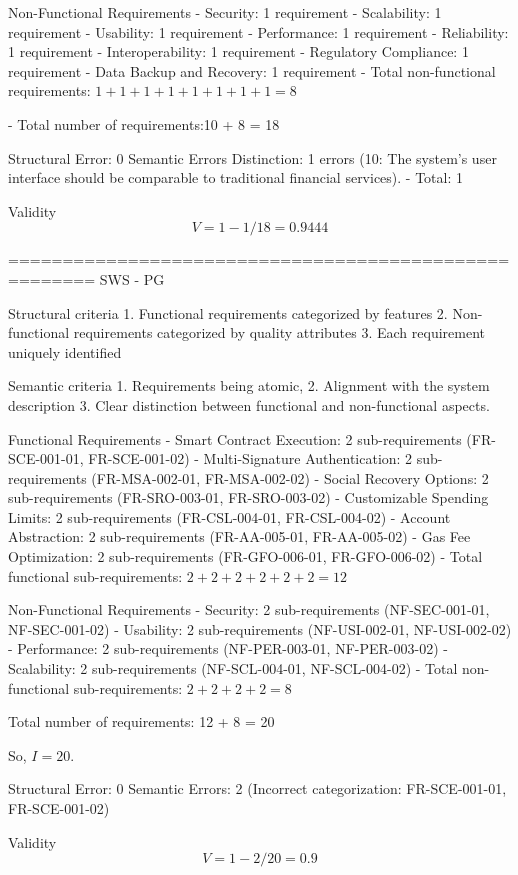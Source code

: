 Non-Functional Requirements
- Security: 1 requirement
- Scalability: 1 requirement
- Usability: 1 requirement
- Performance: 1 requirement
- Reliability: 1 requirement
- Interoperability: 1 requirement
- Regulatory Compliance: 1 requirement
- Data Backup and Recovery: 1 requirement
- Total non-functional requirements: \( 1 + 1 + 1 + 1 + 1 + 1 + 1 + 1 = 8 \)

- Total number of requirements:10 + 8 = 18

Structural Error: 0
Semantic Errors 
\- Distinction: 1 errors (10: The system's user interface should be comparable to traditional financial services).
- Total: 1

Validity
\[
V = 1 - 1/18 = 0.9444
\]

======================================================
SWS - PG

Structural criteria 
1. Functional requirements categorized by features
2. Non-functional requirements categorized by quality attributes
3. Each requirement uniquely identified

Semantic criteria
1. Requirements being atomic, 
2. Alignment with the system description
3. Clear distinction between functional and non-functional aspects. 

Functional Requirements
- Smart Contract Execution: 2 sub-requirements (FR-SCE-001-01, FR-SCE-001-02)
- Multi-Signature Authentication: 2 sub-requirements (FR-MSA-002-01, FR-MSA-002-02)
- Social Recovery Options: 2 sub-requirements (FR-SRO-003-01, FR-SRO-003-02)
- Customizable Spending Limits: 2 sub-requirements (FR-CSL-004-01, FR-CSL-004-02)
- Account Abstraction: 2 sub-requirements (FR-AA-005-01, FR-AA-005-02)
- Gas Fee Optimization: 2 sub-requirements (FR-GFO-006-01, FR-GFO-006-02)
- Total functional sub-requirements: \( 2 + 2 + 2 + 2 + 2 + 2 = 12 \)

Non-Functional Requirements
- Security: 2 sub-requirements (NF-SEC-001-01, NF-SEC-001-02)
- Usability: 2 sub-requirements (NF-USI-002-01, NF-USI-002-02)
- Performance: 2 sub-requirements (NF-PER-003-01, NF-PER-003-02)
- Scalability: 2 sub-requirements (NF-SCL-004-01, NF-SCL-004-02)
- Total non-functional sub-requirements: \( 2 + 2 + 2 + 2 = 8 \)

Total number of requirements: 12 + 8 = 20

So, \( I = 20 \).

Structural Error: 0
Semantic Errors: 2 (Incorrect categorization: FR-SCE-001-01, FR-SCE-001-02)

Validity
\[
V = 1 - 2/20 = 0.9
\]


